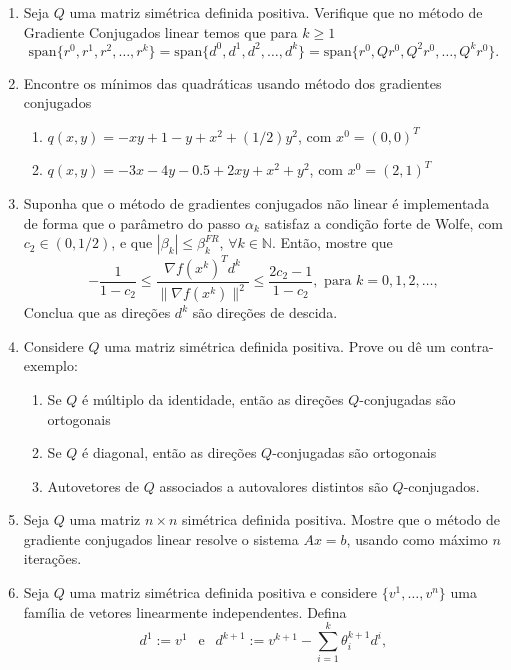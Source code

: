 \documentclass[a4paper,latin]{article}
\begin{document}
    \begin{enumerate}
    \item Seja $Q$ uma matriz simétrica definida positiva. Verifique 
    que no método de Gradiente Conjugados linear temos que para $k \geq 1$
    $$\text{span}\{r^{0}, r^{1}, r^2,  \dots, r^{k}\}=
    \text{span}\{d^{0}, d^{1}, d^2, \dots, d^{k}\}=
    \text{span}\{r^{0},  Qr^{0}, Q^{2} r^{0}, \dots, Q^{k} r^{0}\}.$$ 
    \item Encontre os mínimos das quadráticas usando método dos gradientes conjugados
       \begin{enumerate}
       	\item $q(x,y)=-xy+1-y+x^2+(1/2)y^2$, com $x^{0}=(0,0)^{T}$ 
       	\item $q(x,y)=-3x-4y-0.5+2xy+x^2+y^2$, com $x^0=(2,1)^{T}$
       \end{enumerate}
    \item  
    Suponha que o método de gradientes conjugados não linear é implementada de forma que o parâmetro do passo $\alpha_{k}$ satisfaz a condição forte de Wolfe, com $c_{2}\in (0,1/2)$, e que $|\beta_{k}|\leq \beta_{k}^{FR}$, $\forall k \in \mathbb{N}$. Então, mostre que 
    $$ -\frac{1}{1-c_2} \leq \frac{\nabla f(x^k)^{T}d^{k}}{\|\nabla f(x^k)\|^{2}} \leq \frac{2c_2-1}{1-c_2}, \text{ para } k=0,1,2, \dots,  $$
    Conclua que as direções $d^{k}$ são direções de descida.
    \item Considere $Q$ uma matriz simétrica definida positiva.
    Prove ou dê um contra-exemplo:
       \begin{enumerate}
       \item Se $Q$ é múltiplo da identidade, então as direções 
       $Q$-conjugadas são ortogonais
       \item Se $Q$ é diagonal, então as direções 
       $Q$-conjugadas são ortogonais
       \item Autovetores de $Q$ associados a autovalores distintos 
       são $Q$-conjugados.
       \end{enumerate}   
   \item Seja $Q$ uma matriz $n \times n$ simétrica definida positiva. Mostre que o método de gradiente conjugados linear resolve o sistema $Ax=b$, usando como máximo $n$ iterações. 
    \item Seja $Q$ uma matriz simétrica definida positiva e considere 
    $\{v^1,\dots,v^n\}$ uma família de vetores linearmente independentes. 
    Defina 
    $$d^{1}:=v^{1} \  \ \text{ e } \ \ 
    d^{k+1}:=v^{k+1}-\sum_{i=1}^{k} \theta^{k+1}_{i} d^{i},
$$
\end{enumerate}
\end{document}
